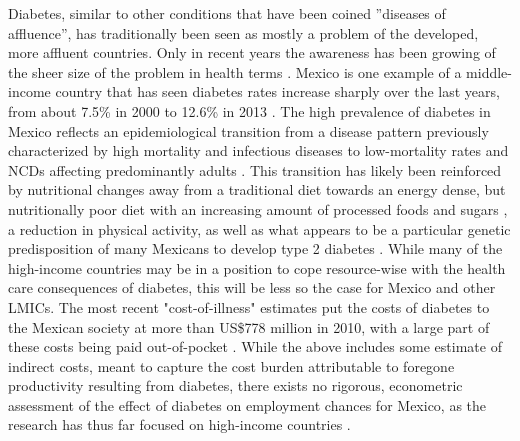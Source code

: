 Diabetes, similar to other conditions that have been coined ''diseases of affluence'', has traditionally been seen as mostly a problem of the developed, more affluent countries. Only in recent
years the awareness has been growing of the sheer size of the problem
in health terms \parencite{Yach2006,Hu2011}. Mexico is one example of
a middle-income country that has seen diabetes rates increase sharply
over the last years, from about 7.5\% in 2000 \parencite{Barquera2013}
to 12.6\% in 2013 \parencite{InternationalDiabetesFederation2013}.
The high prevalence of diabetes in Mexico reflects an epidemiological
transition from a disease pattern previously characterized by high
mortality and infectious diseases to low-mortality rates and \acp{NCD}
affecting predominantly adults \parencite{Stevens2008}. This transition
has likely been reinforced by nutritional changes away from a traditional
diet towards an energy dense, but nutritionally poor diet with an
increasing amount of processed foods and sugars \parencite{Barquera2008b,Basu2013,Rivera2004},
a reduction in physical activity, as well as what appears to be a
particular genetic predisposition of many Mexicans to develop type
2 diabetes \parencite{Williams2013}. While many of the high-income countries
may be in a position to cope resource-wise with the health care consequences
of diabetes, this will be less so the case for Mexico and other \acp{LMIC}.
The most recent "cost-of-illness" estimates put the costs of diabetes
to the Mexican society at more than US\$778 million in 2010, with
a large part of these costs being paid out-of-pocket \parencite{A.2011z}.
While the above includes some estimate of indirect costs, meant to
capture the cost burden attributable to foregone productivity resulting
from diabetes, there exists no rigorous, econometric assessment of
the effect of diabetes on employment chances for Mexico, as the research
has thus far focused on high-income countries \parencite{Lin2011b,Latif2009,Brown2005,Minor2011,Bastida2002,Vijan2004,Zhang2009}.

